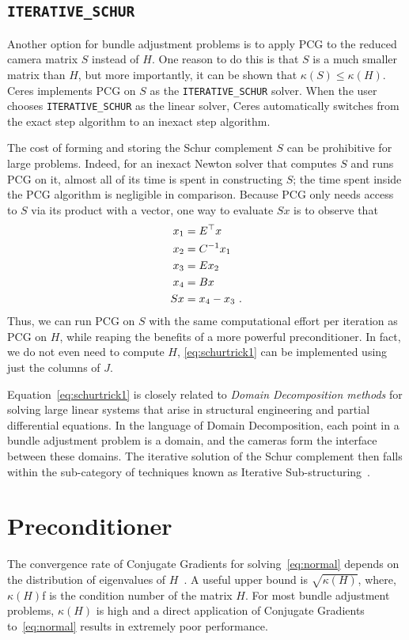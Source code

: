 \subsection{\texttt{ITERATIVE\_SCHUR}}
Another option for bundle adjustment problems is to apply PCG to the reduced camera matrix $S$ instead of $H$. One reason to do this is that $S$ is a much smaller matrix than $H$, but more importantly, it can be shown that $\kappa(S)\leq \kappa(H)$.  Ceres implements PCG on $S$ as the \texttt{ITERATIVE\_SCHUR} solver. When the user chooses \texttt{ITERATIVE\_SCHUR} as the linear solver, Ceres automatically switches from the exact step algorithm to an inexact step algorithm.

The cost of forming and storing the Schur complement $S$ can be prohibitive for large problems. Indeed, for an inexact Newton solver that computes $S$ and runs PCG on it, almost all of its time is spent in constructing $S$; the time spent inside the PCG algorithm is negligible in comparison. Because  PCG only needs access to $S$ via its product with a vector, one way to evaluate $Sx$ is to observe that
\begin{align}
  x_1 &= E^\top x \notag \\
  x_2 &= C^{-1} x_1 \notag\\
  x_3 &= Ex_2 \notag\\
  x_4 &= Bx \notag\\
  Sx &= x_4 - x_3\ .\label{eq:schurtrick1}
\end{align}
Thus, we can run PCG on $S$ with the same computational effort per iteration as PCG on $H$, while reaping the benefits of a more powerful preconditioner. In fact, we do not even need to compute $H$, \eqref{eq:schurtrick1} can be implemented using just the columns of $J$.

Equation~\eqref{eq:schurtrick1} is closely related to {\em Domain Decomposition methods} for solving large linear systems that arise in structural engineering and partial differential equations. In the language of Domain Decomposition, each point in a bundle adjustment problem is a domain, and the cameras form the interface between these domains. The iterative solution of the Schur complement then falls within the sub-category of techniques known as Iterative Sub-structuring~\cite{saad2003iterative,mathew2008domain}.

\section{Preconditioner}
The convergence rate of Conjugate Gradients  for solving~\eqref{eq:normal} depends on the distribution of eigenvalues of $H$~\cite{saad2003iterative}. A useful upper bound is $\sqrt{\kappa(H)}$, where, $\kappa(H)$f is the condition number of the matrix $H$. For most bundle adjustment problems, $\kappa(H)$ is high and a direct application of Conjugate Gradients to~\eqref{eq:normal} results in extremely poor performance.

